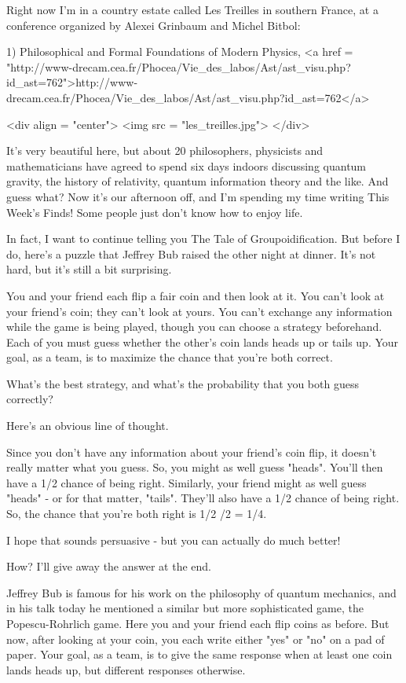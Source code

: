 

Right now I'm in a country estate called Les Treilles in southern 
France, at a conference organized by Alexei Grinbaum and Michel 
Bitbol:

1) Philosophical and Formal Foundations of Modern Physics, 
<a href = "http://www-drecam.cea.fr/Phocea/Vie_des_labos/Ast/ast_visu.php?id_ast=762">http://www-drecam.cea.fr/Phocea/Vie_des_labos/Ast/ast_visu.php?id_ast=762</a>

<div align = "center">
<img src = "les_treilles.jpg">
</div>

It's very beautiful here, but about 20 philosophers, physicists 
and mathematicians have agreed to spend six days indoors discussing 
quantum gravity, the history of relativity, quantum information theory
and the like.  And guess what?  Now it's our afternoon off, and 
I'm spending my time writing This Week's Finds!  Some people just
don't know how to enjoy life.

In fact, I want to continue telling you The Tale of Groupoidification.  
But before I do, here's a puzzle that Jeffrey Bub raised the other night
at dinner.  It's not hard, but it's still a bit surprising.

You and your friend each flip a fair coin and then look at it.  
You can't look at your friend's coin; they can't look at yours.
You can't exchange any information while the game is being played,
though you can choose a strategy beforehand.   Each of you must guess 
whether the other's coin lands heads up or tails up.
Your goal, as a team, is to maximize the chance that you're both 
correct.  

What's the best strategy, and what's the probability that you
both guess correctly?

Here's an obvious line of thought.  

Since you don't have any information about your friend's coin flip, it
doesn't really matter what you guess.  So, you might as well guess
"heads".  You'll then have a 1/2 chance of being right.
Similarly, your friend might as well guess "heads" - or for
that matter, "tails".  They'll also have a 1/2 chance of
being right.  So, the chance that you're both right is 1/2 /2
= 1/4.

I hope that sounds persuasive - but you can actually do much better!

How?  I'll give away the answer at the end.  

Jeffrey Bub is famous for his work on the philosophy of quantum
mechanics, and in his talk today he mentioned a similar but more
sophisticated game, the Popescu-Rohrlich game.  Here you and your
friend each flip coins as before.  But now, after looking at your
coin, you each write either "yes" or "no" on a pad
of paper.  Your goal, as a team, is to give the same response when at
least one coin lands heads up, but different responses otherwise.

